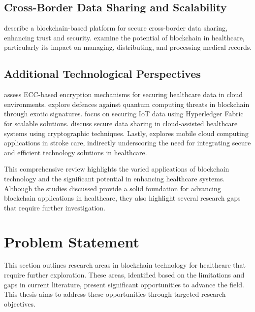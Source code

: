 \documentclass[cic,tc,english]{iiufrgs}
\begin{document}
        \subsection{Cross-Border Data Sharing and Scalability} \citet{Rahman2020} describe a blockchain-based platform for secure cross-border data sharing, enhancing trust and security. \citet{Saeed2022} examine the potential of blockchain in healthcare, particularly its impact on managing, distributing, and processing medical records.
        
        \subsection{Additional Technological Perspectives} \citet{Hema2019} assess ECC-based encryption mechanisms for securing healthcare data in cloud environments. \citet{Naz2024} explore defences against quantum computing threats in blockchain through exotic signatures. \citet{Eghmazi2024} focus on securing IoT data using Hyperledger Fabric for scalable solutions. \citet{XuChang2019} discuss secure data sharing in cloud-assisted healthcare systems using cryptographic techniques. Lastly, \citet{Karaca2019} explores mobile cloud computing applications in stroke care, indirectly underscoring the need for integrating secure and efficient technology solutions in healthcare.

        This comprehensive review highlights the varied applications of blockchain technology and the significant potential in enhancing healthcare systems. Although the studies discussed provide a solid foundation for advancing blockchain applications in healthcare, they also highlight several research gaps that require further investigation.

    \section{Problem Statement}

        This section outlines research areas in blockchain technology for healthcare that require further exploration. These areas, identified based on the limitations and gaps in current literature, present significant opportunities to advance the field. This thesis aims to address these opportunities through targeted research objectives.
\end{document}
